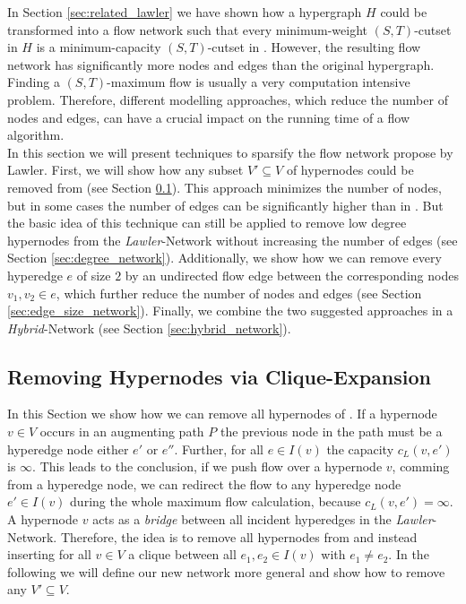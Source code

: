 
In Section \ref{sec:related_lawler} we have shown how a hypergraph $H$ could be transformed into 
a flow network  such that every minimum-weight $(S,T)$-cutset in $H$ is a
minimum-capacity $(S,T)$-cutset in  \cite{lawler1973}. However, the resulting flow
network has significantly more nodes and edges than the original hypergraph. Finding a
$(S,T)$-maximum flow is usually a very computation intensive problem. 
Therefore, different modelling approaches, which reduce the number of nodes and edges,
can have a crucial impact on the running time of a flow algorithm. \\
In this section we will present techniques to sparsify the flow network 
propose by Lawler. First, we will show how any subset $V' \subseteq V$ of hypernodes could be removed 
from  (see Section \ref{sec:heuer_network}). This approach minimizes
the number of nodes, but in some cases the number of edges can be
significantly higher than in . But the basic idea of this technique 
can still be applied to remove low degree hypernodes from the \emph{Lawler}-Network without 
increasing the number of edges (see Section \ref{sec:degree_network}). Additionally, we show
how we can remove every hyperedge $e$ of size $2$ by an undirected flow edge between
the corresponding nodes $v_1,v_2 \in e$, which further reduce the
number of nodes and edges (see Section \ref{sec:edge_size_network}). Finally, we combine
the two suggested approaches in a \emph{Hybrid}-Network (see Section \ref{sec:hybrid_network}).



\subsection{Removing Hypernodes via Clique-Expansion}
\label{sec:heuer_network}

In this Section we show how we can remove all hypernodes of . If a hypernode $v \in V$
occurs in an augmenting path $P$ the previous node in the path must be a hyperedge node either
$e'$ or $e''$. Further, for all $e \in I(v)$ the capacity $c_L(v,e')$ is $\infty$. This leads to
the conclusion, if we push flow over a hypernode $v$, comming from a hyperedge node, we can redirect
the flow to any hyperedge node $e' \in I(v)$ during the whole maximum flow calculation, because 
$c_L(v,e') = \infty$. A hypernode $v$ acts as a \emph{bridge} between all incident hyperedges in the 
\emph{Lawler}-Network. Therefore, the idea is to remove all hypernodes from  and instead
inserting for all $v \in V$ a clique between all $e_1, e_2 \in I(v)$ with $e_1 \neq e_2$.
In the following we will define our new network more general and show how to remove
any $V' \subseteq V$.

